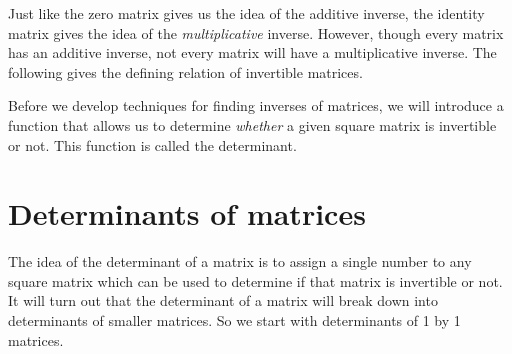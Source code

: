 Just like the zero matrix gives us the idea of the additive inverse, the identity matrix gives the idea of the \textit{multiplicative} inverse. However, though every matrix has an additive inverse, not every matrix will have a multiplicative inverse. The following gives the defining relation of invertible matrices.



\noindent Before we develop techniques for finding inverses of matrices, we will introduce a function that allows us to determine \textit{whether} a given square matrix is invertible or not. This function is called the determinant. 

\section{Determinants of matrices}

The idea of the determinant of a matrix is to assign a single number to any square matrix which can be used to determine if that matrix is invertible or not. It will turn out that the determinant of a matrix will break down into determinants of smaller matrices. So we start with determinants of 1 by 1 matrices.

